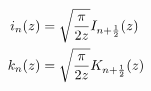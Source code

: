 \documentclass[12pt]{article}
\begin{document}
\begin{align}
i_n(z) &= \sqrt{\frac{\pi}{2z}} I_{n+\frac{1}{2}}(z) \notag \\
k_n(z) &= \sqrt{\frac{\pi}{2z}} K_{n+\frac{1}{2}}(z) \notag
\end{align}
\end{document}
